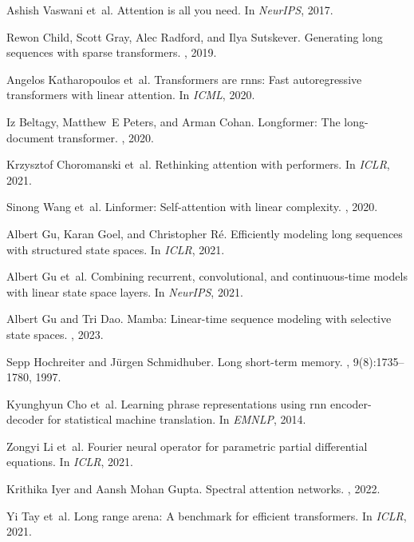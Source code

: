 \documentclass[11pt,letterpaper]{article}
\begin{document}

\begin{thebibliography}{10}

Ashish Vaswani et~al.
\newblock Attention is all you need.
\newblock In {\em NeurIPS}, 2017.

Rewon Child, Scott Gray, Alec Radford, and Ilya Sutskever.
\newblock Generating long sequences with sparse transformers.
, 2019.

Angelos Katharopoulos et~al.
\newblock Transformers are rnns: Fast autoregressive transformers with linear attention.
\newblock In {\em ICML}, 2020.

Iz Beltagy, Matthew~E Peters, and Arman Cohan.
\newblock Longformer: The long-document transformer.
, 2020.

Krzysztof Choromanski et~al.
\newblock Rethinking attention with performers.
\newblock In {\em ICLR}, 2021.

Sinong Wang et~al.
\newblock Linformer: Self-attention with linear complexity.
, 2020.

Albert Gu, Karan Goel, and Christopher R{\'e}.
\newblock Efficiently modeling long sequences with structured state spaces.
\newblock In {\em ICLR}, 2021.

Albert Gu et~al.
\newblock Combining recurrent, convolutional, and continuous-time models with linear state space layers.
\newblock In {\em NeurIPS}, 2021.

Albert Gu and Tri Dao.
\newblock Mamba: Linear-time sequence modeling with selective state spaces.
, 2023.

Sepp Hochreiter and J{\"u}rgen Schmidhuber.
\newblock Long short-term memory.
, 9(8):1735--1780, 1997.

Kyunghyun Cho et~al.
\newblock Learning phrase representations using rnn encoder-decoder for statistical machine translation.
\newblock In {\em EMNLP}, 2014.

Zongyi Li et~al.
\newblock Fourier neural operator for parametric partial differential equations.
\newblock In {\em ICLR}, 2021.

Krithika Iyer and Aansh Mohan Gupta.
\newblock Spectral attention networks.
, 2022.

Yi Tay et~al.
\newblock Long range arena: A benchmark for efficient transformers.
\newblock In {\em ICLR}, 2021.

\end{thebibliography}
\end{document}
